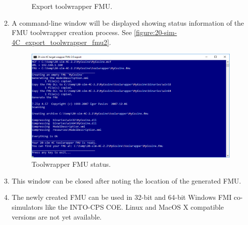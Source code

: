 \begin{enumerate}
\begin{figure}[hpt]
	\caption{Export toolwrapper FMU.}
	\label{figure:20-sim-4C_export_toolwrapper_fmu}
\end{figure}
%
\item A command-line window will be displayed showing status information of the FMU toolwrapper creation process.  See \autoref{figure:20-sim-4C_export_toolwrapper_fmu2}.
%
\begin{figure}[hpt]
	\centerline{\includegraphics[width=\textwidth]{figures/20-sim-4C_export_toolwrapper_fmu2.png}}
	\caption{Toolwrapper FMU status.}
	\label{figure:20-sim-4C_export_toolwrapper_fmu2}
\end{figure}
%
\item This window can be closed after noting the location of the generated FMU.
%
\item The newly created FMU can be used in 32-bit and 64-bit Windows FMI co-simulators like the INTO-CPS COE.  Linux and MacOS X compatible versions are not yet available.
\end{enumerate}